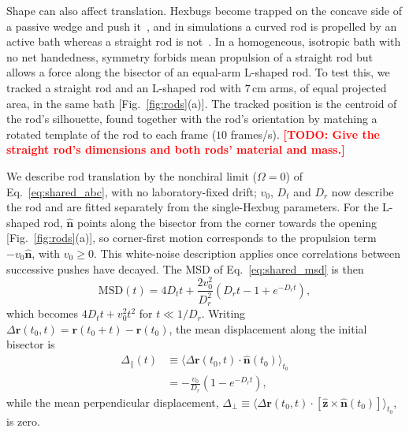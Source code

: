 \documentclass[10pt,twocolumn]{article}
\newcommand{\todo}[1]{\textcolor{red}{\textbf{[TODO: #1]}}}
\begin{document}
Shape can also affect translation.
Hexbugs become trapped on the concave side of a passive wedge and push it~\cite{Balda2022}, and in simulations a curved rod is propelled by an active bath whereas a straight rod is not~\cite{Mallory2014}.
In a homogeneous, isotropic bath with no net handedness, symmetry forbids mean propulsion of a straight rod but allows a force along the bisector of an equal-arm L-shaped rod.
To test this, we tracked a straight rod and an L-shaped rod with $7\,$cm arms, of equal projected area, in the same bath [Fig.~\ref{fig:rods}(a)].
The tracked position is the centroid of the rod's silhouette, found together with the rod's orientation by matching a rotated template of the rod to each frame ($10$ frames/s).
\todo{Give the straight rod's dimensions and both rods' material and mass.}

We describe rod translation by the nonchiral limit ($\Omega=0$) of Eq.~\eqref{eq:shared_abc}, with no laboratory-fixed drift; $v_0$, $D_t$ and $D_r$ now describe the rod and are fitted separately from the single-Hexbug parameters.
For the L-shaped rod, $\hat{\mathbf n}$ points along the bisector from the corner towards the opening [Fig.~\ref{fig:rods}(a)], so corner-first motion corresponds to the propulsion term $-v_0\hat{\mathbf n}$, with $v_0\geq0$.
This white-noise description applies once correlations between successive pushes have decayed.
The MSD of Eq.~\eqref{eq:shared_msd} is then~\cite{Kiechl2026}
\begin{equation}
  \mathrm{MSD}(t)=4D_t t+\frac{2v_0^2}{D_r^2}
    \left(D_r t-1+e^{-D_r t}\right),
  \label{eq:rodmsd}
\end{equation}
which becomes $4D_t t+v_0^2t^2$ for $t\ll1/D_r$.
Writing $\Delta\mathbf r(t_0,t)=\mathbf r(t_0+t)-\mathbf r(t_0)$, the mean displacement along the initial bisector is~\cite{Balda2022}
\begin{equation}
  \begin{aligned}
    \Delta_\parallel(t)
      &\equiv\big\langle\Delta\mathbf r(t_0,t)\cdot\hat{\mathbf n}(t_0)\big\rangle_{t_0}\\
      &=-\frac{v_0}{D_r}\left(1-e^{-D_r t}\right),
  \end{aligned}
  \label{eq:dpar}
\end{equation}
while the mean perpendicular displacement, $\Delta_\perp\equiv\langle\Delta\mathbf r(t_0,t)\cdot[\hat{\mathbf z}\times\hat{\mathbf n}(t_0)]\rangle_{t_0}$, is zero.
\end{document}
